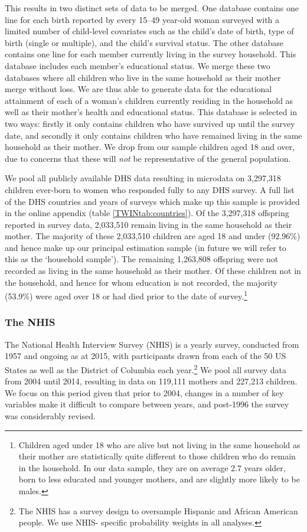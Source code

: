 \documentclass[subeqn]{article}
\begin{document}
\begin{spacing}{1.4}
This results in two distinct sets of data to be merged. One database contains 
one line for each birth reported by every 15--49 year-old woman surveyed with a 
limited number of child-level covariates such as the child's date of birth, type 
of birth (single or multiple), and the child's survival status. The other 
database contains one line for each member currently living in the survey
household. This database includes each member's educational status. We merge
these two databases where all children who live in the same household as their 
mother merge without loss.  We are thus able to generate data for the educational 
attainment of each of a woman's children currently residing in the household as 
well as their mother's health and educational status. This database is selected in 
two ways: firstly it only contains children who have survived up until the survey 
date, and secondly it only contains children who have remained living in the same 
household as their mother. We drop from our sample children aged 18 and over, due
to concerns that these will \emph{not} be representative of the general 
population.

We pool all publicly available DHS data resulting in microdata on 3,297,318 
children ever-born to women who responded fully to any DHS survey. A full list of 
the DHS countries and years of surveys which make up this sample is provided in
the online appendix (table \ref{TWINtab:countries}).  Of the 3,297,318 offspring 
reported in survey data, 2,033,510 remain living in the same household as their 
mother.  The majority of these 2,033,510 children are aged 18 and under (92.96\%) 
and hence make up our principal estimation sample (in future we will refer to this 
as the `household sample'). The remaining 1,263,808 offspring were not recorded as 
living in the same household as their mother.  Of these children not in the 
household, and hence for whom education is not recorded, the majority (53.9\%) 
were aged over 18 or had died prior to the date of survey.\footnote{Children aged 
under 18 who are alive but not living in the same household as their mother are 
statistically quite different to those children who do remain in the household. 
In our data sample, they are on average 2.7 years older, born to less educated 
and younger mothers, and are slightly more likely to be males.}

\subsubsection{The NHIS}
The National Health Interview Survey (NHIS) is a yearly survey, conducted from 
1957 and ongoing as at 2015, with participants drawn from each of the 50 US 
States as well as the District of Columbia each year.\footnote{The NHIS has a
survey design to oversample Hispanic and African American people.  We use NHIS-%
specific probability weights in all analyses.}  We pool all survey data from 
2004 until 2014, resulting in data on 119,111 mothers and 227,213 children. We 
focus on this period given that prior to 2004, changes in a number of key 
variables make it difficult to compare between years, and post-1996 the survey 
was considerably revised.


\end{spacing}
\end{document}
